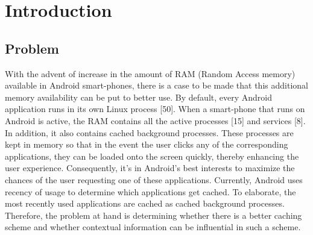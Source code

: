 \documentclass[12pt]{uthesis-v12}  %
\begin{document}

\chapter{Introduction}
	
	\section{Problem}
		With the advent of increase in the amount of RAM (Random Access memory) available in Android smart-phones, there is a case to be made that this additional memory availability can be put to better use. By default, every Android application runs in its own Linux process [50]. When a smart-phone that runs on Android is active, the RAM contains all the active processes [15] and services [8]. In addition, it also contains cached background processes. These processes are kept in memory so that in the event the user clicks any of the corresponding applications, they can be loaded onto the screen quickly, thereby enhancing the user experience. Consequently, it's in Android's best interests to maximize the chances of the user requesting one of these applications. Currently, Android uses recency of usage to determine which applications get cached. To elaborate, the most recently used applications are cached as cached background processes. Therefore, the problem at hand is determining whether there is a better caching scheme and whether contextual information can be influential in such a scheme.
		
\end{document}
